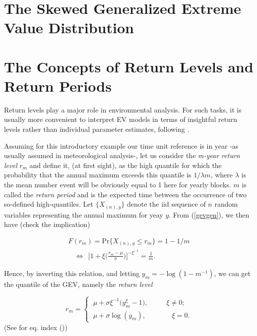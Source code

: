 \documentclass[11pt,a4paper,openany ]{book}
\begin{document}
\section{The Skewed Generalized Extreme Value Distribution}
\cite{ribereau_skew_2016}


\section{The Concepts of Return Levels and Return Periods}\label{rlgev}

Return levels play a major role in environmental analysis. For such tasks, it is usually more convenient to interpret EV models in terms of insightful return levels rather than individual parameter estimates, following \citet[pp.49,pp.81]{coles_introduction_2001}. 

Assuming for this introductory example our time unit reference is in year -as usually assumed in meteorological analysis-, let us consider the \emph{m-year return level} $r_m$ and define it, (at first sight), as the high quantile for which the probability that the annual maximum exceeds this quantile is $1/\lambda m$, where $\lambda$ is the mean number event  will be obviously equal to 1 here for yearly blocks.  $m$ is called the \emph{return period} and is the expected time between the occurrence of two so-defined high-quantiles. Let $\{X_{(n),y}\}$ denote the iid sequence of $n$ random variables representing the annual maximum for yeay $y$. From (\ref{gevgen}), we then have (check the implication)


\begin{align*}
F(r_m)=\text{Pr}\{X_{(n),y}\leq r_m\}=1-1/m 
\\ \ \ \ \ \Leftrightarrow \ \ \Bigg[1+\xi\bigg(\frac{r_m-\mu}{\sigma}\bigg)\Bigg]^{-\xi^{-1}}=\frac{1}{m}.
\end{align*}

Hence, by inverting this relation, and letting $y_m=-\log(1-m^{-1})$, we can get the quantile of the GEV, namely the \emph{return level}

\begin{equation}\label{rleqgev}
r_m=\begin{cases}
\ \mu+\sigma\xi^{-1}\big(y_m^{\xi}-1\big), \ \ \ \ \ \ \ \  \ \ \ \ \xi\neq 0;\\
\ \mu +\sigma \log(y_m), \ \ \ \ \ \ \ \ \  \ \ \ \ \ \ \ \ \xi =0.
\end{cases}
\end{equation}
(See for eq. index ())
\end{document}
